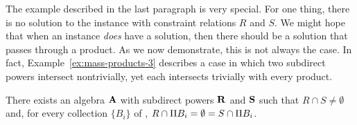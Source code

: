 
  The example described in the last paragraph is very special.
  For one thing, there is no solution to the instance with
  constraint relations $R$ and $S$.
  We might hope that when an instance \emph{does} have a solution,
  then there should be a solution that passes through a \mas product.
  As we now demonstrate, this is not always the case.
  In fact, Example~\ref{ex:mass-products-3} describes a case in which
  two subdirect powers intersect nontrivially,
  yet each intersects trivially with every \mas product.
\begin{proposition}
  \label{claim:mass-products-2}
There exists an algebra $\mathbf{A}$ with subdirect powers $\mathbf{R}$ and $\mathbf{S}$ 
such that 
$R \cap S \neq \emptyset$ and, for every collection $\{B_i\}$ of \masses,
$R \cap \Pi B_i = \emptyset = S \cap \Pi B_i$.
\end{proposition}

